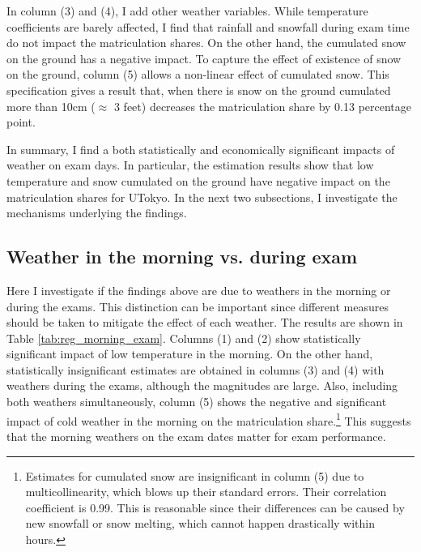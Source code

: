 \documentclass[12pt,letterpaper]{article}
\begin{document}
In column (3) and (4), I add other weather variables.
While temperature coefficients are barely affected, I find that rainfall and snowfall during exam time do not impact the matriculation shares.
On the other hand, the cumulated snow on the ground has a negative impact.
To capture the effect of existence of snow on the ground, column (5) allows a non-linear effect of cumulated snow.
This specification gives a result that, when there is snow on the ground cumulated more than 10cm ($\approx$ 3 feet) decreases the matriculation share by 0.13 percentage point.

In summary, I find a both statistically and economically significant impacts of weather on exam days.
In particular, the estimation results show that low temperature and snow cumulated on the ground have negative impact on the matriculation shares for UTokyo.
In the next two subsections, I investigate the mechanisms underlying the findings. 

%  

\subsection{Weather in the morning vs. during exam}

Here I investigate if the findings above are due to weathers in the morning or during the exams.
This distinction can be important since different measures should be taken to mitigate the effect of each weather.
The results are shown in Table \ref{tab:reg_morning_exam}.
Columns (1) and (2) show statistically significant impact of low temperature in the morning.
On the other hand, statistically insignificant estimates are obtained in columns (3) and (4) with weathers during the exams, although the magnitudes are large.
Also, including both weathers simultaneously, column (5) shows the negative and significant impact of cold weather in the morning on the matriculation share.\footnote{
  Estimates for cumulated snow are insignificant in column (5) due to multicollinearity, which blows up their standard errors.
  Their correlation coefficient is 0.99.
  This is reasonable since their differences can be caused by new snowfall or snow melting, which cannot happen drastically within hours.
}
This suggests that the morning weathers on the exam dates matter for exam performance.
\end{document}
